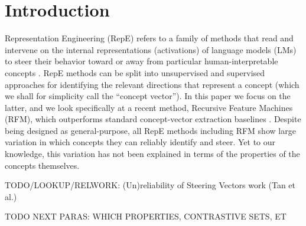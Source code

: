 \documentclass[11pt]{article}
\begin{document}
\section{Introduction}  %

Representation Engineering (RepE) refers to a family of methods that
read and intervene on the internal representations (activations) of 
language models (LMs) to steer their behavior toward or away 
from particular human-interpretable concepts
 \cite{zou2023repe,Wehner2025TaxonomyOpportunitiesChallenges}. 
RepE methods can be split into unsupervised and supervised approaches 
for identifying the relevant directions that represent a concept (which we shall for simplicity call the ``concept vector''). 
In this paper we focus on the latter, and we look specifically at a recent method, Recursive Feature Machines (RFM), which 
outperforms standard concept-vector extraction baselines \cite{beaglehole2026universal}.
Despite being designed as general-purpose, 
all RepE methods including RFM show large variation in which concepts they can
reliably identify and steer. 
Yet to our knowledge, this variation has not been explained in terms of the properties of the concepts themselves.


TODO/LOOKUP/RELWORK: (Un)reliability of Steering Vectors work (Tan et al.)

TODO NEXT PARAS: WHICH PROPERTIES, CONTRASTIVE SETS, ET



\end{document}
